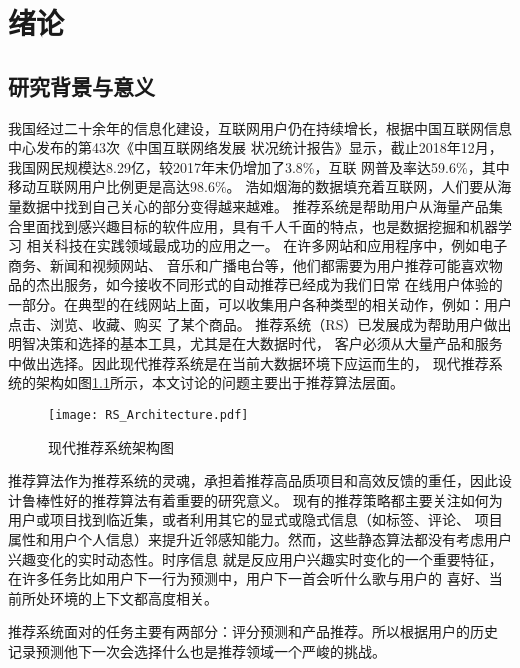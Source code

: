 ﻿%
\chapter{绪论}
\section{研究背景与意义}

我国经过二十余年的信息化建设，互联网用户仍在持续增长，根据中国互联网信息中心发布的第43次《中国互联网络发展%
状况统计报告》显示，截止2018年12月，我国网民规模达8.29亿，较2017年末仍增加了3.8\%，互联%
网普及率达59.6\%，其中移动互联网用户比例更是高达98.6\%。
浩如烟海的数据填充着互联网，人们要从海量数据中找到自己关心的部分变得越来越难。
推荐系统是帮助用户从海量产品集合里面找到感兴趣目标的软件应用，具有千人千面的特点，也是数据挖掘和机器学习%
相关科技在实践领域最成功的应用之一。
在许多网站和应用程序中，例如电子商务、新闻和视频网站、%
音乐和广播电台等，他们都需要为用户推荐可能喜欢物品的杰出服务，如今接收不同形式的自动推荐已经成为我们日常%
在线用户体验的一部分。在典型的在线网站上面，可以收集用户各种类型的相关动作，例如：用户点击、浏览、收藏、购买%
了某个商品。
推荐系统（RS）已发展成为帮助用户做出明智决策和选择的基本工具，尤其是在大数据时代，%
客户必须从大量产品和服务中做出选择。因此现代推荐系统是在当前大数据环境下应运而生的，%
现代推荐系统的架构如图\ref{fig:RS_Architecture}所示，本文讨论的问题主要出于推荐算法层面。

\begin{figure}[htb]
  \centering
  \texttt{[image: RS\_Architecture.pdf]}\\
  \caption{现代推荐系统架构图}
  \label{fig:RS_Architecture}
\end{figure}
推荐算法作为推荐系统的灵魂，承担着推荐高品质项目和高效反馈的重任，因此设计鲁棒性好的推荐算法有着重要的研究意义。
现有的推荐策略都主要关注如何为用户或项目找到临近集，或者利用其它的显式或隐式信息（如标签、评论、%
项目属性和用户个人信息）来提升近邻感知能力。然而，这些静态算法都没有考虑用户兴趣变化的实时动态性。时序信息%
就是反应用户兴趣实时变化的一个重要特征，在许多任务比如用户下一行为预测中，用户下一首会听什么歌与用户的%
喜好、当前所处环境的上下文都高度相关。

推荐系统面对的任务主要有两部分：评分预测和产品推荐。所以根据用户的历史%
记录预测他下一次会选择什么也是推荐领域一个严峻的挑战。



